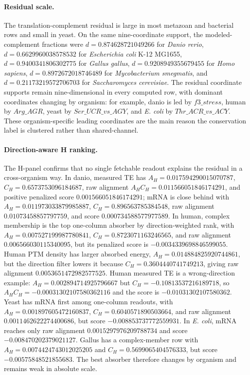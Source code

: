\paragraph{Residual scale.}
The translation-complement residual is large in most metazoan and bacterial rows and small in yeast.  On the same nine-coordinate support, the modeled-complement fractions were $d=0.874628721049266$ for \textit{Danio rerio}, $d=0.6629960038578532$ for \textit{Escherichia coli} K-12 MG1655, $d=0.9400341806302775$ for \textit{Gallus gallus}, $d=0.9208949355679455$ for \textit{Homo sapiens}, $d=0.8972672018746489$ for \textit{Mycobacterium smegmatis}, and $d=0.21173219572706703$ for \textit{Saccharomyces cerevisiae}.  The residual coordinate supports remain nine-dimensional in every computed row, with dominant coordinates changing by organism: for example, danio is led by $f3\_stress$, human by $Arg\_AGR$, yeast by $Ser\_UCR\_vs\_AGY$, and \textit{E. coli} by $Thr\_ACR\_vs\_ACY$.  These organism-specific leading coordinates are the main reason the conservation label is clustered rather than shared-channel.

\paragraph{Direction-aware H ranking.}
The H-panel confirms that no single fetchable readout explains the residual in a cross-organism way.  In danio, measured TE has $A_H=0.017594290015070787$, $C_H=0.6573753096184687$, raw alignment $A_HC_H=0.011566051846174291$, and positive penalized score $0.001566051846174291$; mRNA is close behind with $A_H=0.011973033879985887$, $C_H=0.896563785384548$, raw alignment $0.01073458857797759$, and score $0.000734588577977589$.  In human, complex membership is the top one-column absorber by direction-weighted rank, with $A_H=0.007527199987780841$, $C_H=0.8723071163246565$, and raw alignment $0.006566030115340095$, but its penalized score is $-0.0034339698846599055$.  Human PTM density has larger absorbed energy, $A_H=0.014884825920744861$, but the direction filter lowers it because $C_H=0.3604440741749213$, giving raw alignment $0.0053651472982577525$.  Human measured TE is a wrong-direction example: $A_H=0.002894714925796667$ but $C_H=-0.10813537216189718$, so $A_HC_H=-0.00031302107580362116$ and the score is $-0.01031302107580362$.  Yeast has mRNA first among one-column readouts, with $A_H=0.001897605472160837$, $C_H=0.6040571890503664$, and raw alignment $0.0011462622274400686$, but score $-0.008853737772559931$.  In \textit{E. coli}, mRNA reaches only raw alignment $0.0015297976209788734$ and score $-0.008470202379021127$.  Gallus has a complex-member row with $A_H=0.0074424743012025205$ and $C_H=0.5699065404576333$, but score $-0.00575848521855683$.  The best absorber therefore changes by organism and remains weak in absolute scale.

